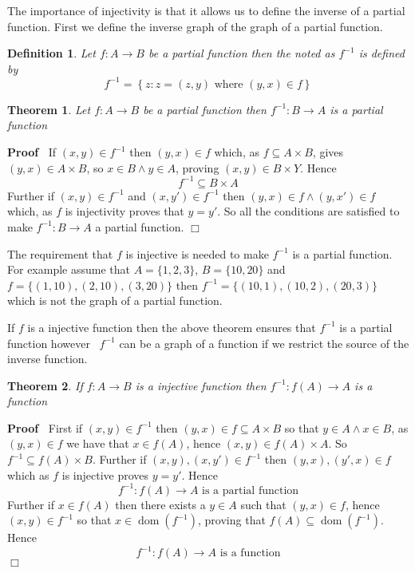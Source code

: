 \documentclass{book}
\newcommand{\of}{:}
\newcommand{\tmop}[1]{\ensuremath{\operatorname{#1}}}
\newcommand{\tmtextbf}[1]{\text{{\bfseries{#1}}}}
\newenvironment{proof}{\noindent\textbf{Proof\ }}{\hspace*{\fill}$\Box$\medskip}
\newtheorem{definition}{Definition}
{\theorembodyfont{\rmfamily}\newtheorem{example}{Example}}
\newtheorem{theorem}{Theorem}
\begin{document}
The importance of injectivity is that it allows us to define the inverse of a
partial function. First we define the inverse graph of the graph of a partial
function.

\begin{definition}
  \label{partial function inverse graph}Let $f : A \rightarrow B$ be a partial
  function then the \tmtextbf{inverse of the graph f} noted as $f^{- 1}$ is
  defined by
  \[ f^{- 1} = \left\{ z \of z = (z, y) \text{ where } (y, x) \in f \right\}
  \]
\end{definition}

\begin{theorem}
  \label{partial function inverse if injective}Let $f : A \rightarrow B$ be a
  \tmtextbf{injective }partial function then $f^{- 1} : B \rightarrow A$ is a
  partial function
\end{theorem}

\begin{proof}
  If $(x, y) \in f^{- 1}$ then $ (y, x) \in f$ which, as $f \subseteq A \times
  B$, gives $(y, x) \in A \times B$, so $x \in B \wedge y \in A$, proving $(x,
  y) \in B \times Y$. Hence
  \[ f^{- 1} \subseteq B \times A \]
  Further if $(x, y) \in f^{- 1}$ and $(x, y') \in f^{- 1}$ then $(y, x) \in f
  \wedge (y, x') \in f$ which, as $f$ is injectivity proves that $y = y'$. So
  all the conditions are satisfied to make $f^{- 1} : B \rightarrow A$ a
  partial function.
\end{proof}

\begin{note}
  The requirement that $f$ is injective is needed to make $f^{- 1}$ is a
  partial function. For example assume that $A = \{ 1, 2, 3 \}$, $B = \{ 10,
  20 \}$ and $f = \{ (1, 10), (2, 10), (3, 20) \}$ then $f^{- 1} = \{ (10, 1),
  (10, 2), (20, 3) \}$ which is not the graph of a partial function. 
\end{note}

If $f$ is a injective function then the above theorem ensures that $f^{- 1}$
is a partial function however \ $f^{- 1}$ can be a graph of a function if we
restrict the source of the inverse function.

\begin{theorem}
  \label{function injective inverse is a function}If $f : A \rightarrow B$ is
  a injective function then $f^{- 1} : f (A) \rightarrow A$ is a function
\end{theorem}

\begin{proof}
  First if $(x, y) \in f^{- 1}$ then $(y, x) \in f \subseteq A \times B$ so
  that $y \in A \wedge x \in B$, as $(y, x) \in f$ we have that $x \in f (A)$,
  hence $(x, y) \in f (A) \times A$. So $f^{- 1} \subseteq f (A) \times B$.
  Further if $(x, y), (x, y') \in f^{- 1}$ then $(y, x), (y', x) \in f$ which
  as $f$ is injective proves $y = y'$. Hence
  \[ f^{- 1} : f (A) \rightarrow A \text{ is a partial function} \]
  Further if $x \in f (A)$ then there exists a $y \in A$ such that $(y, x) \in
  f$, hence $(x, y) \in f^{- 1}$ so that $x \in \tmop{dom} (f^{- 1})$, proving
  that $f (A) \subseteq \tmop{dom} (f^{- 1})$. Hence
  \[ f^{- 1} : f (A) \rightarrow A \text{ is a function} \]
\end{proof}
\end{document}
